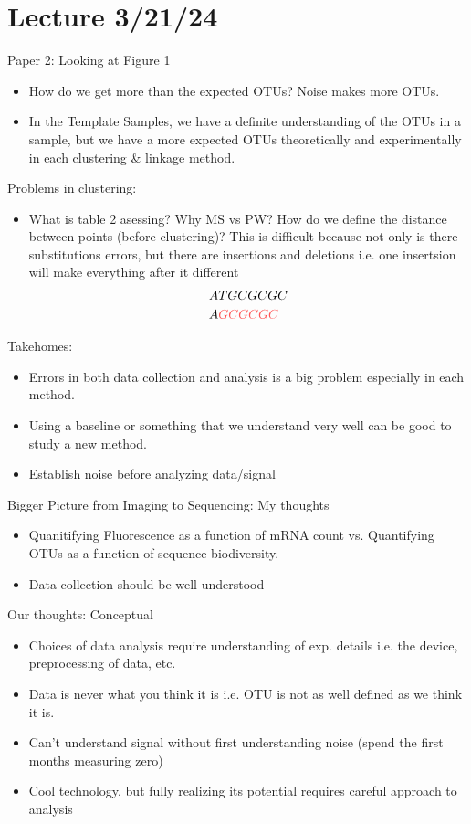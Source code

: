 \documentclass[../main.tex]{subfiles}
\begin{document}
\section*{Lecture 3/21/24}
Paper 2: Looking at Figure 1
\begin{itemize}
    \item How do we get more than the expected OTUs? Noise makes more OTUs.
    \item In the Template Samples, we have a definite understanding of the OTUs in a sample, but we
    have a more expected OTUs theoretically and experimentally in each clustering \& linkage method.
\end{itemize}
Problems in clustering:
\begin{itemize}
    \item What is table 2 asessing? Why MS vs PW? How do we define the distance between points (before clustering)?
    This is difficult because not only is there substitutions errors, but there are insertions and deletions
    i.e. one insertsion will make everything after it different
    \begin{align*}
        &ATGCGCGC \\
        &A\color{draculared}{GCGCGC}
    \end{align*}
\end{itemize}
Takehomes:
\begin{itemize}
    \item Errors in both data collection and analysis is a big problem especially in each method.
    \item Using a baseline or something that we understand very well can be good to study a new method.
    \item Establish noise before analyzing data/signal
\end{itemize}
Bigger Picture from Imaging to Sequencing: My thoughts
\begin{itemize}
    \item Quanitifying Fluorescence as a function of mRNA count vs. Quantifying OTUs as a function
    of sequence biodiversity. 
    \item Data collection should be well understood 
\end{itemize}
Our thoughts: Conceptual
\begin{itemize}
    \item Choices of data analysis require understanding of exp. details i.e. the device, preprocessing
    of data, etc.
    \item Data is never what you think it is i.e. OTU is not as well defined as we think it is.
    \item Can't understand signal without first understanding noise (spend the first months measuring zero)
    \item Cool technology, but fully realizing its potential requires careful approach to analysis
\end{itemize}
\end{document}
